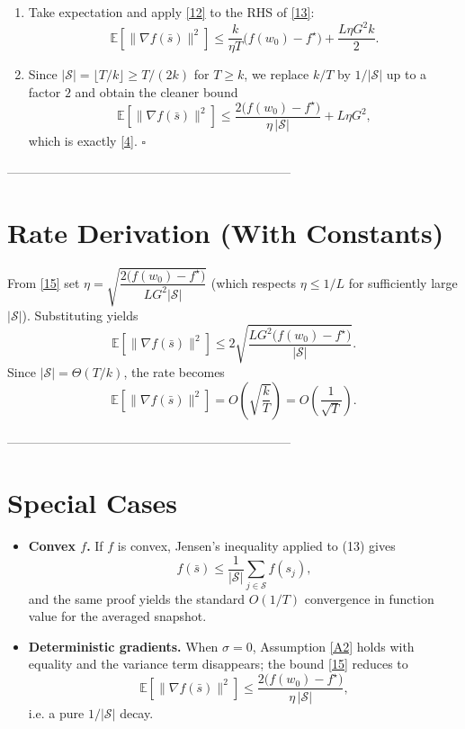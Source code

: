 \documentclass{article}
\newcommand{\E}{\mathbb{E}}
\begin{document}
\begin{enumerate}
\item[Step 9.] Take expectation and apply \eqref{12} to the RHS of \eqref{13}:
\[
\E\!\left[\|\nabla f(\bar s)\|^{2}\right]
\le
\frac{k}{\eta T}\bigl(f(w_0)-f^{\star}\bigr)
+\frac{L\eta G^{2}k}{2}.
\tag{14}
\]

\item[Step 10.] Since $|\mathcal{S}|=\lfloor T/k\rfloor\ge T/(2k)$ for $T\ge k$, we replace $k/T$ by $1/|\mathcal{S}|$ up to a factor $2$ and obtain the cleaner bound
\[
\E\!\left[\|\nabla f(\bar s)\|^{2}\right]
\le
\frac{2\bigl(f(w_0)-f^{\star}\bigr)}{\eta\,|\mathcal{S}|}
+L\eta G^{2},
\tag{15}
\]
which is exactly \eqref{4}. \hfill $\square$
\end{enumerate}

--------------------------------------------------------------------

\section*{Rate Derivation (With Constants)}
From \eqref{15} set $\eta = \sqrt{\dfrac{2\bigl(f(w_0)-f^{\star}\bigr)}{L G^{2} |\mathcal{S}|}}$ (which respects $\eta\le 1/L$ for sufficiently large $|\mathcal{S}|$). Substituting yields
\[
\E\!\left[\|\nabla f(\bar s)\|^{2}\right]
\le 2\sqrt{\frac{L G^{2}\bigl(f(w_0)-f^{\star}\bigr)}{|\mathcal{S}|}}.
\]
Since $|\mathcal{S}| = \Theta(T/k)$, the rate becomes
\[
\E\!\left[\|\nabla f(\bar s)\|^{2}\right]=O\!\left(\sqrt{\frac{k}{T}}\right)=O\!\left(\frac{1}{\sqrt{T}}\right).
\]

--------------------------------------------------------------------

\section*{Special Cases}
\begin{itemize}
\item \textbf{Convex $f$.} If $f$ is convex, Jensen’s inequality applied to (13) gives
\[
f(\bar s)\le\frac{1}{|\mathcal{S}|}\sum_{j\in\mathcal{S}}f(s_j),
\]
and the same proof yields the standard $O(1/T)$ convergence in function value for the averaged snapshot.
\item \textbf{Deterministic gradients.} When $\sigma=0$, Assumption \ref{A2} holds with equality and the variance term disappears; the bound \eqref{15} reduces to
\[
\E\!\left[\|\nabla f(\bar s)\|^{2}\right]\le\frac{2\bigl(f(w_0)-f^{\star}\bigr)}{\eta\,|\mathcal{S}|},
\]
i.e. a pure $1/|\mathcal{S}|$ decay.
\end{itemize}
\end{document}
